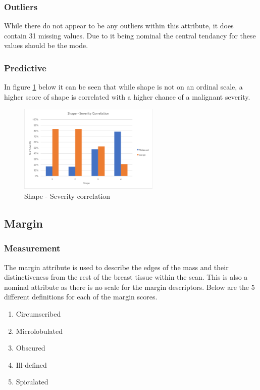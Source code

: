\documentclass[12pt]{article}
\begin{document}
      \subsubsection{Outliers}
        While there do not appear to be any outliers within this attribute, it does contain 31 missing values. Due to it being nominal the central tendancy for these values should be the mode.

      \subsubsection{Predictive}
        In figure \ref{fig:shape-severity-correlation} below it can be seen that while shape is not on an ordinal scale, a higher score of shape is correlated with a higher chance of a malignant severity.

        \begin{figure}[H]
          \centering
          \includegraphics[width=0.6\textwidth]{shape-severity-correlation}
          \caption{Shape - Severity correlation}
          \label{fig:shape-severity-correlation}
        \end{figure}

    \subsection{Margin}
      \subsubsection{Measurement}
        The margin attribute is used to describe the edges of the mass and their distinctiveness from the rest of the breast tissue within the scan. This is also a nominal attribute as there is no scale for the margin descriptors. Below are the 5 different definitions for each of the margin scores.

        \begin{enumerate}[label=\arabic*)]
          \item Circumscribed
          \item Microlobulated
          \item Obscured
          \item Ill-defined
          \item Spiculated
        \end{enumerate}
\end{document}
